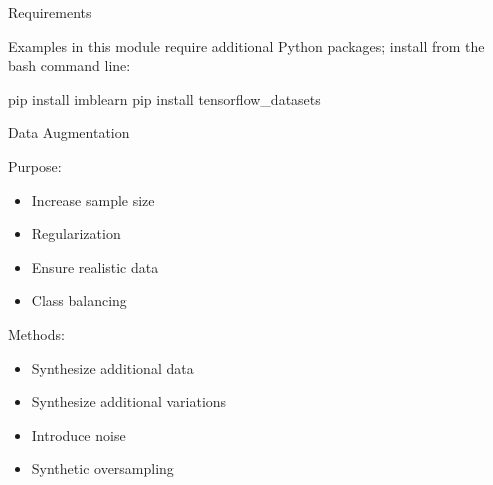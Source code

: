 \documentclass[ignorenonframetext,xcolor=x11names]{beamer}
\begin{document}
\begin{frame}[label=withcode,fragile]{Requirements}

Examples in this module require additional Python packages; install from the bash command line:

\begin{bashcode}
pip install imblearn
pip install tensorflow_datasets
\end{bashcode}
\end{frame}


\begin{frame}[label=full]{Data Augmentation}

\begin{block}{Purpose:}
\begin{itemize}
   \item Increase sample size
   \item Regularization
   \item Ensure realistic data
   \item Class balancing
\end{itemize}
\end{block}

\begin{block}{Methods:}
\begin{itemize}
     \item Synthesize additional data
     \item Synthesize additional variations
     \item Introduce noise
     \item Synthetic oversampling
\end{itemize}
\end{block}
\end{frame}
\end{document}
